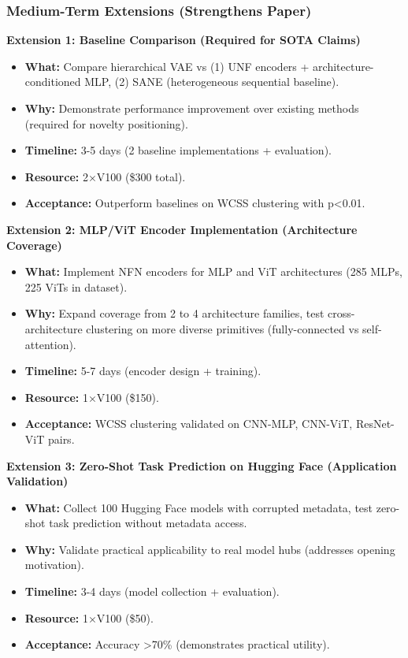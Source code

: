 \subsubsection{Medium-Term Extensions (Strengthens Paper)}

\textbf{Extension 1: Baseline Comparison (Required for SOTA Claims)}

\begin{itemize}
\item \textbf{What:} Compare hierarchical VAE vs (1) UNF encoders + architecture-conditioned MLP, (2) SANE (heterogeneous sequential baseline).
\item \textbf{Why:} Demonstrate performance improvement over existing methods (required for novelty positioning).
\item \textbf{Timeline:} 3-5 days (2 baseline implementations + evaluation).
\item \textbf{Resource:} 2$\times$V100 (\$300 total).
\item \textbf{Acceptance:} Outperform baselines on WCSS clustering with p<0.01.
\end{itemize}

\textbf{Extension 2: MLP/ViT Encoder Implementation (Architecture Coverage)}

\begin{itemize}
\item \textbf{What:} Implement NFN encoders for MLP and ViT architectures (285 MLPs, 225 ViTs in dataset).
\item \textbf{Why:} Expand coverage from 2 to 4 architecture families, test cross-architecture clustering on more diverse primitives (fully-connected vs self-attention).
\item \textbf{Timeline:} 5-7 days (encoder design + training).
\item \textbf{Resource:} 1$\times$V100 (\$150).
\item \textbf{Acceptance:} WCSS clustering validated on CNN-MLP, CNN-ViT, ResNet-ViT pairs.
\end{itemize}

\textbf{Extension 3: Zero-Shot Task Prediction on Hugging Face (Application Validation)}

\begin{itemize}
\item \textbf{What:} Collect 100 Hugging Face models with corrupted metadata, test zero-shot task prediction without metadata access.
\item \textbf{Why:} Validate practical applicability to real model hubs (addresses opening motivation).
\item \textbf{Timeline:} 3-4 days (model collection + evaluation).
\item \textbf{Resource:} 1$\times$V100 (\$50).
\item \textbf{Acceptance:} Accuracy >70\% (demonstrates practical utility).
\end{itemize}

